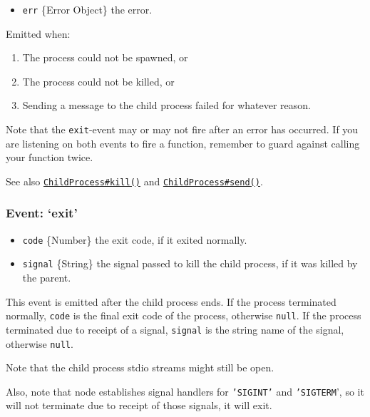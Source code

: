 \begin{itemize}
\itemsep1pt\parskip0pt
\item
  \texttt{err} \{Error Object\} the error.
\end{itemize}

Emitted when:

\begin{enumerate}
\def\labelenumi{\arabic{enumi}.}
\itemsep1pt\parskip0pt
\item
  The process could not be spawned, or
\item
  The process could not be killed, or
\item
  Sending a message to the child process failed for whatever reason.
\end{enumerate}

Note that the \texttt{exit}-event may or may not fire after an error has
occurred. If you are listening on both events to fire a function,
remember to guard against calling your function twice.

See also
\hyperref[childux5fprocessux5fchildux5fkillux5fsignal]{\texttt{ChildProcess\#kill()}}
and
\hyperref[childux5fprocessux5fchildux5fsendux5fmessageux5fsendhandle]{\texttt{ChildProcess\#send()}}.

\subsubsection{Event: `exit'}\label{event-exit}

\begin{itemize}
\itemsep1pt\parskip0pt
\item
  \texttt{code} \{Number\} the exit code, if it exited normally.
\item
  \texttt{signal} \{String\} the signal passed to kill the child
  process, if it was killed by the parent.
\end{itemize}

This event is emitted after the child process ends. If the process
terminated normally, \texttt{code} is the final exit code of the
process, otherwise \texttt{null}. If the process terminated due to
receipt of a signal, \texttt{signal} is the string name of the signal,
otherwise \texttt{null}.

Note that the child process stdio streams might still be open.

Also, note that node establishes signal handlers for \texttt{'SIGINT'}
and \texttt{'SIGTERM}', so it will not terminate due to receipt of those
signals, it will exit.

